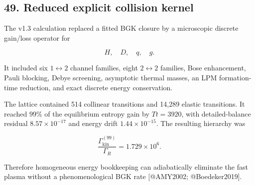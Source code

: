\documentclass[
]{article}
\begin{document}
\hypertarget{reduced-explicit-collision-kernel}{%
\subsection{49. Reduced explicit collision
kernel}\label{reduced-explicit-collision-kernel}}

The v1.3 calculation replaced a fitted BGK closure by a microscopic
discrete gain/loss operator for

\[
H,\quad D,\quad q,\quad g.
\]

It included six \(1\leftrightarrow2\) channel families, eight
\(2\leftrightarrow2\) families, Bose enhancement, Pauli blocking, Debye
screening, asymptotic thermal masses, an LPM formation-time reduction,
and exact discrete energy conservation.

The lattice contained 514 collinear transitions and 14,289 elastic
transitions. It reached \(99\%\) of the equilibrium entropy gain by
\(Tt=3920\), with detailed-balance residual \(8.57\times10^{-17}\) and
energy drift \(1.44\times10^{-15}\). The resulting hierarchy was

\[
\frac{\Gamma_{\mathrm{kin}}^{(99)}}{\Gamma_R}
=1.729\times10^6.
\]

Therefore homogeneous energy bookkeeping can adiabatically eliminate the
fast plasma without a phenomenological BGK rate {[}@AMY2002;
@Boedeker2019{]}.
\end{document}
